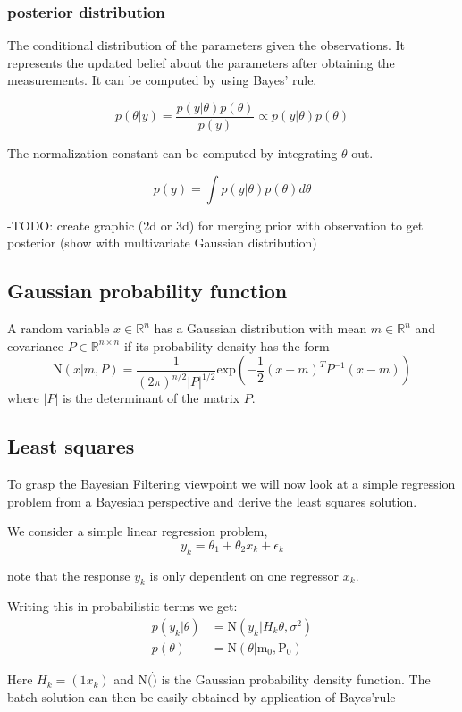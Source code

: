 \subsubsection{posterior distribution}
The conditional distribution of the parameters given the observations.
It represents the updated belief about the parameters
after obtaining the measurements. It can be computed by using Bayes' rule.

$$ p(\theta | y) = \frac{p(y | \theta) p(\theta)}{p(y)}
\propto p(y | \theta) p(\theta) $$

The normalization constant can be computed by integrating $\theta$ out.

$$ p(y) = \int p(y | \theta) p(\theta) d\theta $$

-TODO: create graphic (2d or 3d) for merging prior with observation to get
    posterior (show with multivariate Gaussian distribution)

\subsection{Gaussian probability function}
A random variable $x \in \mathbb{R}^n$ has a Gaussian distribution with mean
$m \in \mathbb{R}^n$ and covariance $P \in \mathbb{R}^{n\times n}$ if its
probability density has the form
$$ \text{N}(x | m, P) = \frac{1}{(2\pi)^{n / 2} |P|^{1/2}}
\text{exp} \left( -\frac{1}{2} (x - m)^T P^{-1} (x-m) \right) $$
where $|P|$ is the determinant of the matrix $P$.
    
\subsection{Least squares}
To grasp the Bayesian Filtering viewpoint we will now look
at a simple regression problem from a Bayesian perspective
and derive the least squares solution.

We consider a simple linear regression problem,
$$ y_k = \theta_1 + \theta_2 x_k + \epsilon_k $$

note that the response $y_k$ is only dependent on one regressor $x_k$.

Writing this in probabilistic terms we get:
\begin{align}
  p(y_k | \theta) &= \text{N}(y_k | H_k \theta, \sigma^2) \\
  p(\theta) &= \text{N}(\theta | \text{m}_0, \text{P}_0)
\end{align}

Here $H_k = (1 x_k)$ and N$(\dot)$ is the Gaussian probability density function.
The batch solution can then be easily obtained by application of Bayes'rule

